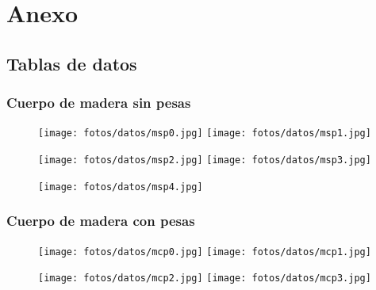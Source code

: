 \documentclass{article}
\begin{document}

\pagebreak
\section{Anexo}
\subsection{Tablas de datos}
\subsubsection{Cuerpo de madera sin pesas}

\begin{figure}[h]
\centering
\hspace*{-2cm}
\texttt{[image: fotos/datos/msp0.jpg]}\hfill
\texttt{[image: fotos/datos/msp1.jpg]}
\hspace*{-2cm}
\end{figure}

\begin{figure}[h]
\centering
\hspace*{-2cm}
\texttt{[image: fotos/datos/msp2.jpg]}\hfill
\texttt{[image: fotos/datos/msp3.jpg]}
\hspace*{-2cm}
\end{figure}

\begin{figure}[h]
\centering
\texttt{[image: fotos/datos/msp4.jpg]}\hfill
\end{figure}


\clearpage
\subsubsection{Cuerpo de madera con pesas}

\begin{figure}[h]
\centering
\hspace*{-2cm}
\texttt{[image: fotos/datos/mcp0.jpg]}\hfill
\texttt{[image: fotos/datos/mcp1.jpg]}
\hspace*{-2cm}
\end{figure}

\begin{figure}[h]
\centering
\hspace*{-2cm}
\texttt{[image: fotos/datos/mcp2.jpg]}\hfill
\texttt{[image: fotos/datos/mcp3.jpg]}
\hspace*{-2cm}
\end{figure}
\end{document}
